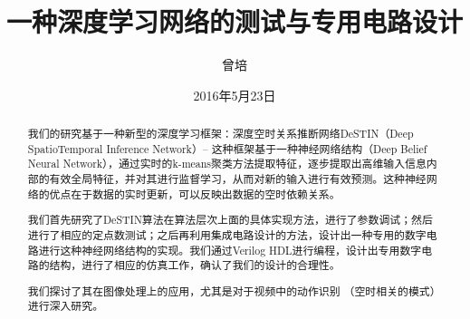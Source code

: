 \documentclass[winfonts]{njuthesis}
\title{一种深度学习网络的测试与专用电路设计}
\author{曾培}
\date{2016年5月23日}
\begin{document}



\maketitle

\controlpage

\begin{abstract}
我们的研究基于一种新型的深度学习框架：深度空时关系推断网络DeSTIN（Deep SpatioTemporal Inference Network）-- 这种框架基于一种神经网络结构（Deep Belief Neural Network），通过实时的k-means聚类方法提取特征，逐步提取出高维输入信息内部的有效全局特征，并对其进行监督学习，从而对新的输入进行有效预测。这种神经网络的优点在于数据的实时更新，可以反映出数据的空时依赖关系。

我们首先研究了DeSTIN算法在算法层次上面的具体实现方法，进行了参数调试；然后进行了相应的定点数测试；之后再利用集成电路设计的方法，设计出一种专用的数字电路进行这种神经网络结构的实现。我们通过Verilog HDL进行编程，设计出专用数字电路的结构，进行了相应的仿真工作，确认了我们的设计的合理性。 

我们探讨了其在图像处理上的应用，尤其是对于视频中的动作识别 （空时相关的模式）进行深入研究。

\end{abstract}
\end{document}
